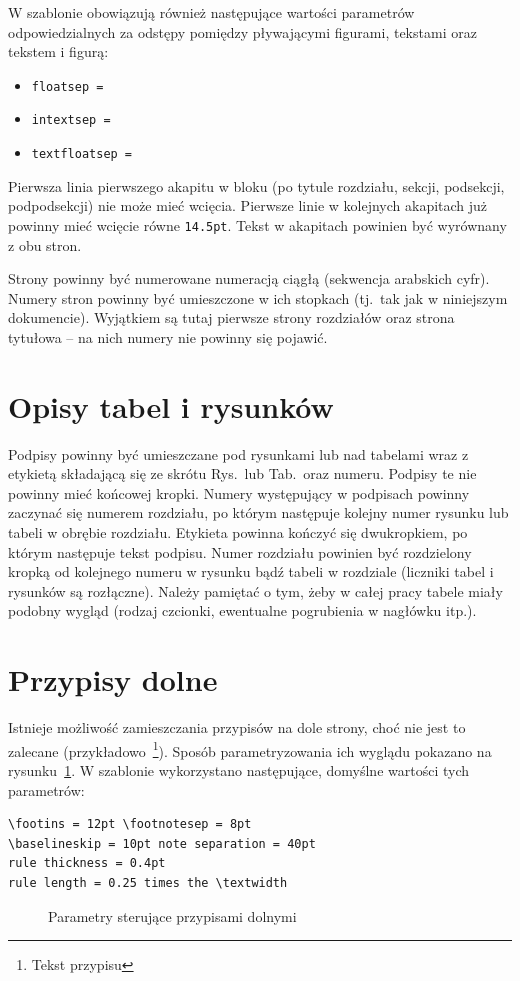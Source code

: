 W szablonie obowiązują również następujące wartości parametrów odpowiedzialnych za odstępy pomiędzy pływającymi figurami, tekstami oraz tekstem i figurą:
\begin{itemize}
	\item \texttt{floatsep = \printlength{\floatsep}}
	\item \texttt{intextsep = \printlength{\intextsep}}
	\item \texttt{textfloatsep = \printlength{\textfloatsep}}
\end{itemize}

Pierwsza linia pierwszego akapitu w bloku (po tytule rozdziału, sekcji, podsekcji, podpodsekcji) nie może mieć wcięcia. Pierwsze linie w kolejnych akapitach już powinny mieć wcięcie równe \texttt{14.5pt}. Tekst w akapitach powinien być wyrównany z obu stron.


Strony powinny być numerowane numeracją ciągłą (sekwencja arabskich cyfr). Numery stron powinny być umieszczone w ich stopkach (tj.\ tak jak w niniejszym dokumencie). Wyjątkiem są tutaj pierwsze strony rozdziałów oraz strona tytułowa -- na nich numery nie powinny się pojawić.

\section{Opisy tabel i rysunków}
Podpisy powinny być umieszczane pod rysunkami lub nad tabelami wraz z etykietą składającą się ze skrótu Rys.\ lub Tab.\ oraz numeru. Podpisy te nie powinny mieć końcowej kropki. Numery występujący w podpisach powinny zaczynać się numerem rozdziału, po którym następuje kolejny numer rysunku lub tabeli w obrębie rozdziału. Etykieta powinna kończyć się dwukropkiem, po którym następuje tekst podpisu. Numer rozdziału powinien być rozdzielony kropką od kolejnego numeru w rysunku bądź tabeli w rozdziale (liczniki tabel i rysunków są rozłączne). Należy pamiętać o tym, żeby w całej pracy tabele miały podobny wygląd (rodzaj czcionki, ewentualne pogrubienia w nagłówku itp.). %

\section{Przypisy dolne}
Istnieje możliwość zamieszczania przypisów na dole strony, choć nie jest to zalecane (przykładowo~\footnote{Tekst przypisu}). Sposób parametryzowania ich wyglądu pokazano na rysunku~\ref{fig:fp}. W szablonie wykorzystano następujące, domyślne wartości tych parametrów:
\begin{lstlisting}[basicstyle=\footnotesize\ttfamily]
\footins = 12pt \footnotesep = 8pt
\baselineskip = 10pt note separation = 40pt
rule thickness = 0.4pt
rule length = 0.25 times the \textwidth
\end{lstlisting}
\begin{figure}[htb]
	\drawfootnote
	\caption{Parametry sterujące przypisami dolnymi} \label{fig:fp}
\end{figure}

